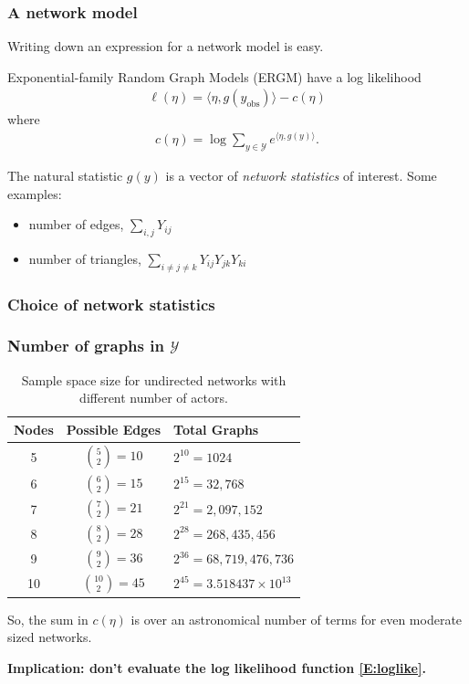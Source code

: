 \documentclass[slidestop,compress, 10pt]{beamer}
\def\YY{{\mathcal Y}}
\newcommand{\inner}[1]{\langle #1 \rangle}
\newcommand{\yobs}{y_{\text{obs}}}
\begin{document}
\frame
{
\frametitle{A network model}

Writing down an expression for a network model is easy.  

Exponential-family Random Graph Models (ERGM) have a log likelihood
\begin{align} \label{E:loglike}
	\ell( \eta) = \inner{\eta, g(\yobs)} - c(\eta)
\end{align}
where
\begin{align*}
	c(\eta) = \log \sum_{y \in \YY} e^{\inner{\eta, g(y)}}.
\end{align*}

The natural statistic $g(y)$ is a vector of \emph{network statistics} of interest.  Some examples:
\begin{itemize}
	\item number of edges, $\sum_{i,j} Y_{ij}$
	\item number of triangles, $\sum_{i \neq j \neq k} Y_{ij}Y_{jk}Y_{ki}$
\end{itemize}


}

\frame
{
\frametitle{Choice of network statistics}

}
\frame
{
\frametitle{Number of graphs in $\YY$}
\begin{table}[h!] 
\caption{Sample space size for undirected networks with different number of 
actors.}

\begin{tabular}{ccl} 
\hline 
Nodes & Possible Edges & Total Graphs \\ [1ex]
\hline
5 & ${5 \choose 2} = 10$ & $2^{10} = 1024$ \\ [1ex]
6 & ${6 \choose 2} = 15$ & $2^{15} = 32,768$ \\ [1ex]
7 & ${7 \choose 2} = 21$ & $2^{21} = 2,097,152$ \\ [1ex]
8 & ${8 \choose 2} = 28$ & $2^{28} = 268,435,456$ \\ [1ex]
9 & ${9 \choose 2} = 36$ & $2^{36} = 68,719,476,736$ \\ [1ex]
10 & ${10 \choose 2} = 45$ & $2^{45} = 3.518437\times10^{13}$ \\ [1ex]
\hline 
\end{tabular} \label{T:number graphs}
\end{table}

So, the sum in $c(\eta)$ is over an astronomical number of terms for 
even moderate sized networks.

\textbf{Implication: don't evaluate the log likelihood function \eqref{E:loglike}.}
}
\end{document}
